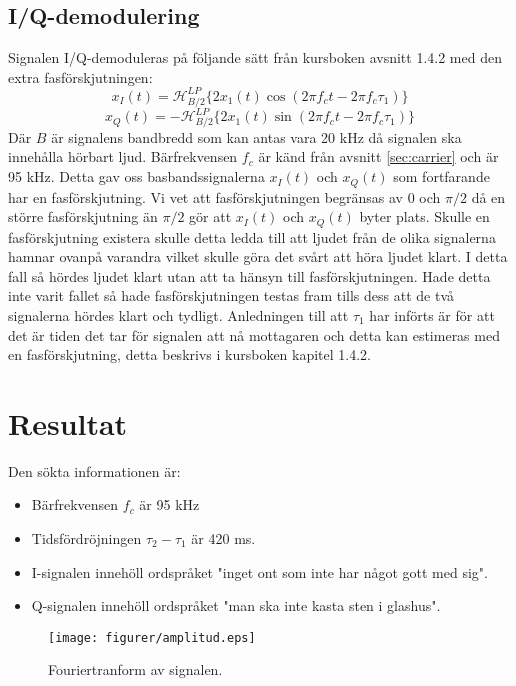 \documentclass[10pt,twocolumn]{article}
\begin{document}
\subsection{I/Q-demodulering}
Signalen I/Q-demoduleras på följande sätt från kursboken avsnitt 1.4.2 med den extra fasförskjutningen:
$$ x_I(t)= \mathcal{H}^{LP}_{B/2}\{ 2x_1(t)\cos(2 \pi f_c t -2\pi f_c\tau_1) \}$$
$$ x_Q(t)= -\mathcal{H}^{LP}_{B/2}\{ 2x_1(t)\sin(2 \pi f_c t -2\pi f_c\tau_1) \}$$
Där $B$ är signalens bandbredd som kan antas vara 20 kHz då signalen ska innehålla hörbart ljud. Bärfrekvensen $f_c$ är känd från avsnitt \ref{sec:carrier} och är 95 kHz. Detta gav oss basbandssignalerna $x_I(t)$ och $x_Q(t)$ som fortfarande har en fasförskjutning. Vi vet att fasförskjutningen begränsas av 0 och $\pi/2$ då en större fasförskjutning än $\pi/2$ gör att $x_I(t)$ och $x_Q(t)$ byter plats. Skulle en fasförskjutning existera skulle detta ledda till att ljudet från de olika signalerna hamnar ovanpå varandra vilket skulle göra det svårt att höra ljudet klart. I detta fall så hördes ljudet klart utan att ta hänsyn till fasförskjutningen. Hade detta inte varit fallet så hade fasförskjutningen testas fram tills dess att de två signalerna hördes klart och tydligt. Anledningen till att $\tau_1$ har införts är för att det är tiden det tar för signalen att nå mottagaren och detta kan estimeras med en fasförskjutning, detta beskrivs i kursboken kapitel 1.4.2.  

\section{Resultat}

Den sökta informationen är:
\begin{itemize}
\item Bärfrekvensen $f_c$ är 95 kHz
\item Tidsfördröjningen $\tau_2-\tau_1$ är 420 ms.
\item I-signalen innehöll ordspråket "inget ont som inte har något gott med sig".
\item Q-signalen innehöll ordspråket "man ska inte kasta sten i glashus".
\end{itemize}


\begin{figure}[H]
	\begin{center}
		\texttt{[image: figurer/amplitud.eps]}
	\end{center}
	\caption{Fouriertranform av signalen.}
	\label{fig:amplitud}
\end{figure}
\end{document}
